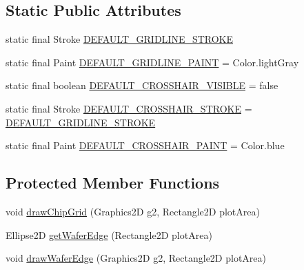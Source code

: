 \subsection*{Static Public Attributes}
\begin{DoxyCompactItemize}
\item 
static final Stroke \mbox{\hyperlink{classorg_1_1jfree_1_1chart_1_1plot_1_1_wafer_map_plot_ad345b1d0e1361e413de6b711baa8335f}{D\+E\+F\+A\+U\+L\+T\+\_\+\+G\+R\+I\+D\+L\+I\+N\+E\+\_\+\+S\+T\+R\+O\+KE}}
\item 
static final Paint \mbox{\hyperlink{classorg_1_1jfree_1_1chart_1_1plot_1_1_wafer_map_plot_ad1af1bf5d4ad17cf261465a652d9d2d6}{D\+E\+F\+A\+U\+L\+T\+\_\+\+G\+R\+I\+D\+L\+I\+N\+E\+\_\+\+P\+A\+I\+NT}} = Color.\+light\+Gray
\item 
static final boolean \mbox{\hyperlink{classorg_1_1jfree_1_1chart_1_1plot_1_1_wafer_map_plot_a9a9b46d20f90d19e24e699d1836f3098}{D\+E\+F\+A\+U\+L\+T\+\_\+\+C\+R\+O\+S\+S\+H\+A\+I\+R\+\_\+\+V\+I\+S\+I\+B\+LE}} = false
\item 
static final Stroke \mbox{\hyperlink{classorg_1_1jfree_1_1chart_1_1plot_1_1_wafer_map_plot_a38fb6e3af7102d38752a4a0236971c92}{D\+E\+F\+A\+U\+L\+T\+\_\+\+C\+R\+O\+S\+S\+H\+A\+I\+R\+\_\+\+S\+T\+R\+O\+KE}} = \mbox{\hyperlink{classorg_1_1jfree_1_1chart_1_1plot_1_1_wafer_map_plot_ad345b1d0e1361e413de6b711baa8335f}{D\+E\+F\+A\+U\+L\+T\+\_\+\+G\+R\+I\+D\+L\+I\+N\+E\+\_\+\+S\+T\+R\+O\+KE}}
\item 
static final Paint \mbox{\hyperlink{classorg_1_1jfree_1_1chart_1_1plot_1_1_wafer_map_plot_a7f548dffec89c74a7b9aa2ccc6884e91}{D\+E\+F\+A\+U\+L\+T\+\_\+\+C\+R\+O\+S\+S\+H\+A\+I\+R\+\_\+\+P\+A\+I\+NT}} = Color.\+blue
\end{DoxyCompactItemize}
\subsection*{Protected Member Functions}
\begin{DoxyCompactItemize}
\item 
void \mbox{\hyperlink{classorg_1_1jfree_1_1chart_1_1plot_1_1_wafer_map_plot_afc24cfda433d6cc993b2cebfb6458f5e}{draw\+Chip\+Grid}} (Graphics2D g2, Rectangle2D plot\+Area)
\item 
Ellipse2D \mbox{\hyperlink{classorg_1_1jfree_1_1chart_1_1plot_1_1_wafer_map_plot_a7f99d796829df11a5912ccbd1ddd5e00}{get\+Wafer\+Edge}} (Rectangle2D plot\+Area)
\item 
void \mbox{\hyperlink{classorg_1_1jfree_1_1chart_1_1plot_1_1_wafer_map_plot_a2661812e9bce4c36f56708fd4a488282}{draw\+Wafer\+Edge}} (Graphics2D g2, Rectangle2D plot\+Area)
\end{DoxyCompactItemize}
